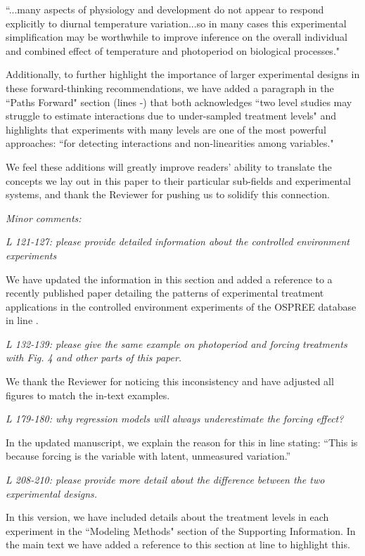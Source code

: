 \documentclass[11pt]{article}
\begin{document}
``...many aspects of physiology and development do not appear to respond explicitly to diurnal temperature variation...so in many cases this experimental simplification may be worthwhile to improve inference on the overall individual and combined effect of temperature and photoperiod on biological processes."

Additionally, to further highlight the importance of larger experimental designs in these forward-thinking recommendations, we have added a paragraph in the ``Paths Forward" section (lines -) that both acknowledges
``two level studies may struggle to estimate interactions due to under-sampled treatment levels" and highlights that experiments with many levels are one of the most powerful approaches: ``for detecting interactions and non-linearities among variables."

We feel these additions will greatly improve readers' ability to translate the concepts we lay out in this paper to their particular sub-fields and experimental systems, and thank the Reviewer for pushing us to solidify this connection.

\emph{Minor comments:}

\emph{L 121-127: please provide detailed information about the controlled environment experiments}

We have updated the information in this section and added a reference to a recently published paper detailing the patterns of experimental treatment applications in the controlled environment experiments of the OSPREE database in line .

\emph{L 132-139: please give the same example on photoperiod and forcing treatments with Fig. 4 and other parts of this paper.}

We thank the Reviewer for noticing this inconsistency and have adjusted all figures to match the in-text examples.

\emph{L 179-180: why regression models will always underestimate the forcing effect?}

In the updated manuscript, we explain the reason for this in line  stating: ``This is because forcing is the variable with latent, unmeasured variation.''

\emph{L 208-210: please provide more detail about the difference between the two experimental designs.}

In this version, we have included details about the treatment levels in each experiment in the ``Modeling Methods" section of the Supporting Information. In the main text we have added a reference to this section at line  to highlight this.
\end{document}
